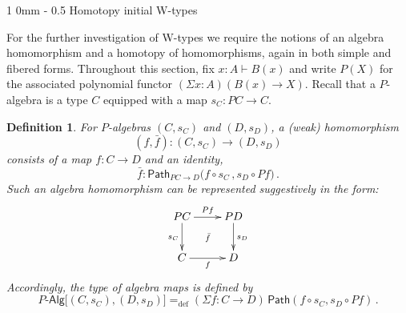 \documentclass[10pt,a4paper,oneside,reqno]{amsart}
\makeatletter
\numberwithin{equation}{section}
\renewcommand{\section}{\@startsection
  {section}%
   {1}%
  {0mm}%
   {-\baselineskip}%
  {0.5\baselineskip}%
   {\Large\bfseries}}%
\theoremstyle{mythm}
\theoremstyle{mydef}
\newtheorem{definition}[theorem]{Definition}
\theoremstyle{myrmk}
\newcommand{\defeq}{=_{\mathrm{def}}}
\newcommand{\prd}[1]{\Pi_{#1}}
\newcommand{\lam}[1]{\lambda_{#1}}
\newcommand{\Id}{\mathsf{Path}}
\newcommand{\id}[1]{\Id_{#1}}
\newcommand{\W}{\mathsf{W}}
\newcommand{\wsup}{\mathsf{sup}}
\newcommand{\UU}{\mathsf{U}}
\newcommand{\Palg}{P\text{-}\mathsf{Alg}}
\makeatother
\begin{document}
%



\section{Homotopy initial W-types}

For the further investigation of W-types we require the notions of an algebra homomorphism and a homotopy of homomorphisms, again in both simple and fibered forms.  Throughout this section, fix $x:A\vdash B(x)$ and write $P(X)$ for the associated polynomial functor $(\Sigma x : A) (B(x) \rightarrow X)$.  Recall that a $P$-algebra is a type $C$ equipped with a map
$s_C :  PC \rightarrow C$.  

\begin{definition}
For $P$-algebras $(C,s_C)$ and $(D,s_D)$, a \emph{(weak) 
homomorphism}  $$(f, \bar{f}) : (C, s_C) \rightarrow (D, s_D)$$
consists of a map $f : C \rightarrow D$ and an identity,
\[
\bar{f} : \id{PC \rightarrow D}\big( f \circ s_C \, ,  s_{D} \circ Pf \big) \, .
\]
Such an algebra homomorphism can be represented suggestively in the form:
\[
\xymatrix{
 PC \ar[d]_{s_C} \ar[r]^{Pf}  \ar@{}[dr]|{\bar{f}} &  PD \ar[d]^{s_D}\\
C \ar[r]_{f}   & D }
\] 
Accordingly, the type of algebra maps is defined by
\[
\Palg
\big[ (C,s_C), (D, s_D)  \big]
 \defeq  
(\Sigma f:  C \rightarrow D) \, \Id(f\circ s_C, s_D\circ Pf) \, .
\]
\end{definition}
\medskip
\end{document}
